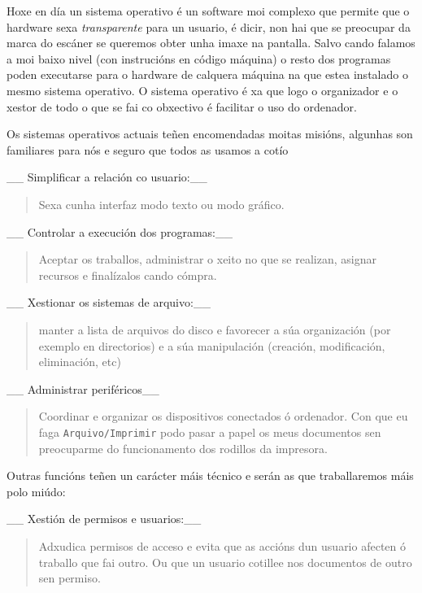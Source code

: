Hoxe en día un sistema operativo é un software moi complexo que permite
que o hardware sexa \emph{transparente} para un usuario, é dicir, non
hai que se preocupar da marca do escáner se queremos obter unha imaxe na
pantalla. Salvo cando falamos a moi baixo nivel (con instrucións en
código máquina) o resto dos programas poden executarse para o hardware
de calquera máquina na que estea instalado o mesmo sistema operativo. O
sistema operativo é xa que logo o organizador e o xestor de todo o que
se fai co obxectivo é facilitar o uso do ordenador.

Os sistemas operativos actuais teñen encomendadas moitas misións,
algunhas son familiares para nós e seguro que todos as usamos a cotío

\_\_ Simplificar a relación co usuario:\_\_

\begin{quote}
Sexa cunha interfaz modo texto ou modo gráfico.
\end{quote}

\_\_ Controlar a execución dos programas:\_\_

\begin{quote}
Aceptar os traballos, administrar o xeito no que se realizan, asignar
recursos e finalízalos cando cómpra.
\end{quote}

\_\_ Xestionar os sistemas de arquivo:\_\_

\begin{quote}
manter a lista de arquivos do disco e favorecer a súa organización (por
exemplo en directorios) e a súa manipulación (creación, modificación,
eliminación, etc)
\end{quote}

\_\_ Administrar periféricos\_\_

\begin{quote}
Coordinar e organizar os dispositivos conectados ó ordenador. Con que eu
faga \texttt{Arquivo/Imprimir} podo pasar a papel os meus documentos sen
preocuparme do funcionamento dos rodillos da impresora.
\end{quote}

Outras funcións teñen un carácter máis técnico e serán as que
traballaremos máis polo miúdo:

\_\_ Xestión de permisos e usuarios:\_\_

\begin{quote}
Adxudica permisos de acceso e evita que as accións dun usuario afecten ó
traballo que fai outro. Ou que un usuario cotillee nos documentos de
outro sen permiso.
\end{quote}

